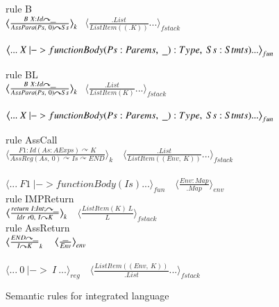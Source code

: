 \documentclass[conference]{IEEEtran}
\begin{document}
\begin{figure}
rule B\\
$\big\langle\frac{B~X:Id\curvearrowright \underline{\hbox to 2mm{}}}{AssPara(Ps,~0)\curvearrowright Ss}\big\rangle_k$$~~~\big\langle\frac{.List}{ListItem((.K))}...\big\rangle_{fstack}$\\ \\
$\big\langle ...~ X ~|-> functionBody(Ps:Parems,~\underline{\hbox to 2mm{}}):Type,~Ss:Stmts) ...\big\rangle_{fun}\\$

rule BL\\
$\big\langle\frac{B~X:Id\curvearrowright \underline{\hbox to 2mm{}}}{AssPara(Ps,~0)\curvearrowright Ss}\big\rangle_k$$~~~\big\langle\frac{.List}{ListItem(K)}...\big\rangle_{fstack}$\\ \\
$\big\langle ...~ X ~|-> functionBody(Ps:Parems,~\underline{\hbox to 2mm{}}):Type,~Ss:Stmts) ...\big\rangle_{fun}\\$

rule AssCall\\
$\big\langle\frac{F1:Id(As:AExps)\curvearrowright K}{AssReg(As,~0)\curvearrowright Is\curvearrowright END}\big\rangle_k$
$~~~\big\langle\frac{.List}{ListItem((Env,~K))}...\big\rangle_{fstack}$\\ \\
$\big\langle ... ~F1~|->functionBody(Is) ...\big\rangle_{fun}$ $~~~\big\langle\frac{Env:Map}{.Map}\big\rangle_{env}$\\

rule IMPReturn\\
$\big\langle\frac{return~I:Int;\curvearrowright \underline{\hbox to 2mm{}}}{ldr~r0,~I\curvearrowright K}\big\rangle_k$
$~~~\big\langle\frac{ListItem(K)~L}{L}\big\rangle_{fstack}$\\

rule AssReturn\\
$\big\langle\frac{END\curvearrowright \underline{\hbox to 2mm{}}}{I\curvearrowright K}_{k}$
$~~~\big\langle\frac{\underline{\hbox to 2mm{}}}{Env}\big\rangle_{env}$\\ \\
$\big\langle ...~0~|->~I~...\big\rangle_{reg}$
$~~~\big\langle\frac{ListItem((Env,~K))}{.List} ...\big\rangle_{fstack}$


  \caption{Semantic rules for integrated language}
  \label{semantics}
\end{figure}
\end{document}
